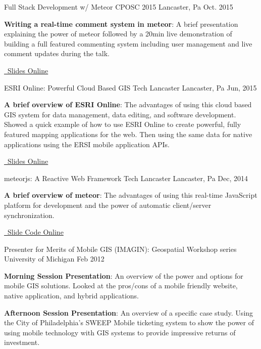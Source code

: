 \begin{cventries}
  \cventry
    {Full Stack Development w/ Meteor}
    {CPOSC 2015}
    {Lancaster, Pa}
    {Oct. 2015}
    {
      \begin{cvitems}
        \item {\textbf{Writing a real-time comment system in meteor}: A brief presentation explaining the power of meteor followed by a 20min live demonstration of building a full featured commenting system including user management and live comment updates during the talk.}
        \item {\href{http://rjfisher.github.io/CPOSC-2015-Meteor-Slides/}{\faGithubSquare\ Slides Online}}
      \end{cvitems}
    }

  \cventry
    {ESRI Online: Powerful Cloud Based GIS}
    {Tech Lancaster}
    {Lancaster, Pa}
    {Jun, 2015}
    {
      \begin{cvitems}
        \item {\textbf{A brief overview of ESRI Online}: The advantages of using this cloud based GIS system for data management, data editing, and software development.  Showed a quick example of how to use ESRI Online to create powerful, fully featured mapping applications for the web.  Then using the same data for native applications using the ERSI mobile application APIs.}
        \item {\href{http://rjfisher.github.io/TechLancaster-ESRI-Online/}{\faGithubSquare\ Slides Online}}
      \end{cvitems}
    }

  \cventry
    {meteorjs: A Reactive Web Framework}
    {Tech Lancaster}
    {Lancaster, Pa}
    {Dec, 2014}
    {
      \begin{cvitems}
        \item {\textbf{A brief overview of meteor}: The advantages of using this real-time JavaScript platform for development and the power of automatic client/server synchronization.}
        \item {\href{https://github.com/rjfisher/TechLancaster-Meteor-Talk/}{\faGithubSquare\ Slide Code Online}}
      \end{cvitems}
    }

  \cventry
    {Presenter for Merits of Mobile GIS}
    {(IMAGIN): Geospatial Workshop series}
    {University of Michigan}
    {Feb 2012}
    {
      \begin{cvitems}
        \item {\textbf{Morning Session Presentation}: An overview of the power and options for mobile GIS solutions.  Looked at the pros/cons of a mobile friendly website, native application, and hybrid applications.}
        \item {\textbf{Afternoon Session Presentation}: An overview of a specific case study.  Using the City of Philadelphia's SWEEP Mobile ticketing system to show the power of using mobile technology with GIS systems to provide impressive returns of investment.}
      \end{cvitems}
    }
\end{cventries}
